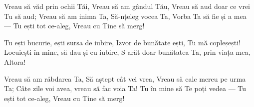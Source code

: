 \beginverse
Vreau să văd prin ochii Tăi,
Vreau să am gândul Tău,
Vreau să aud doar ce vrei Tu să aud;
Vreau să am inima Ta,
Să-nțeleg vocea Ta,
Vorba Ta să fie și a mea —
Tu ești tot ce-aleg,
Vreau cu Tine să merg!
\endverse

\beginchorus
Tu ești bucurie, ești sursa de iubire,
Izvor de bunătate ești, Tu mă copleșești!
Locuiești în mine, să dau și eu iubire,
S-arăt doar bunătatea Ta, prin viața mea,
Altora!
\endchorus

\beginverse
Vreau să am răbdarea Ta,
Să aștept cât vei vrea,
Vreau să calc mereu pe urma Ta;
Câte zile voi avea, vreau să fac voia Ta!
Tu în mine să Te poți vedea —
Tu ești tot ce-aleg,
Vreau cu Tine să merg!
\endverse
\endsong